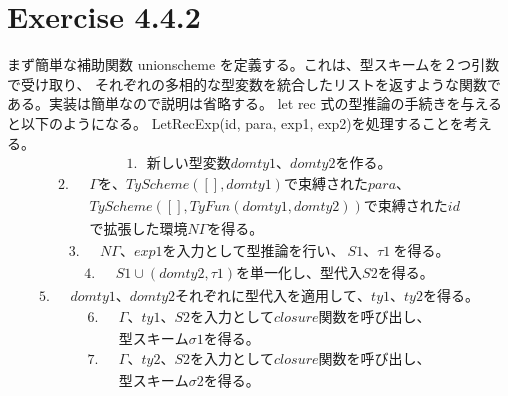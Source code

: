 \documentclass{jreport}
\begin{document}
\section{Exercise 4.4.2}
まず簡単な補助関数 unionscheme を定義する。これは、型スキームを２つ引数で受け取り、
それぞれの多相的な型変数を統合したリストを返すような関数である。実装は簡単なので説明は省略する。
let rec 式の型推論の手続きを与えると以下のようになる。
LetRecExp(id, para, exp1, exp2)を処理することを考える。
\begin{equation}
  \begin{split}
    1. \ \ \ 新しい型変数 domty1、domty2 を作る。
  \end{split}
\end{equation}
\begin{equation}
  \begin{split}
    2. \ \ \ &\Gamma を、TyScheme([], domty1)で束縛された para、\\ &
    TyScheme([], TyFun(domty1, domty2))で束縛された id \\ &
    で拡張した環境 N\Gamma を得る。
  \end{split}
\end{equation}
\begin{equation}
  \begin{split}
    3. \ \ \ &N\Gamma、exp1 を入力として型推論を行い、\ S1、\tau1 \ を得る。
  \end{split}
\end{equation}
\begin{equation}
  \begin{split}
    4. \ \ \ &S1 \cup (domty2, \tau1)を単一化し、型代入 S2 を得る。
  \end{split}
\end{equation}
\begin{equation}
  \begin{split}
    5. \ \ \ &domty1、domty2 それぞれに型代入を適用して、ty1、ty2 を得る。
  \end{split}
\end{equation}
\begin{equation}
  \begin{split}
    6. \ \ \ &\Gamma、ty1、S2 を入力として closure関数を呼び出し、\\ &
    型スキーム\sigma1 を得る。
  \end{split}
\end{equation}
\begin{equation}
  \begin{split}
    7. \ \ \ &\Gamma、ty2、S2 を入力として closure関数を呼び出し、\\ &
    型スキーム\sigma2 を得る。
  \end{split}
\end{equation}
\end{document}
